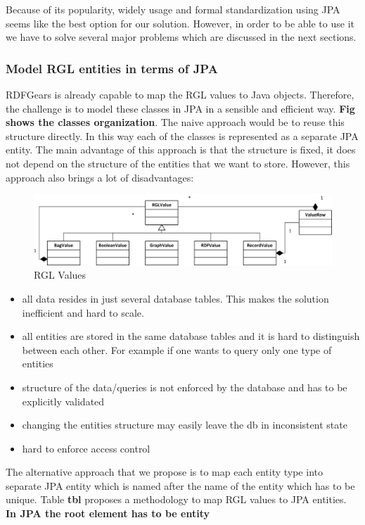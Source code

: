 \documentclass[a4paper, notitlepage]{article}
\begin{document}
Because of its popularity, widely usage and formal standardization using JPA seems like the best option for our solution. However, in order to be able to use it we have to solve several major problems which are discussed in the next sections.


\subsubsection{Model RGL entities in terms of JPA}
RDFGears is already capable to map the RGL values to Java objects. Therefore, the challenge is to model these classes in JPA in a sensible and efficient way. \textbf{Fig shows the classes organization}. The naive approach would be to reuse this structure directly. In this way each of the classes is represented as a separate JPA entity. The main advantage of this approach is that the structure is fixed, it does not depend on the structure of the entities that we want to store. However, this approach also brings a lot of disadvantages: 

\begin{figure}[h!]
  \centering
  	\includegraphics[scale=0.8]{diagrams/RGLValues.png}
  \caption{RGL Values }
  \label{fig_rglValues}
\end{figure}

\begin{itemize}
	\item all data resides in just several database tables. This makes the solution inefficient and hard to scale.
	\item all entities are stored in the same database tables and it is hard to distinguish between each other. For example if one wants to query only one type of entities
	\item structure of the data/queries is not enforced by the database and has to be explicitly validated
	\item changing the entities structure may easily leave the db in inconsistent state
	\item hard to enforce access control
\end{itemize}

The alternative approach that we propose is to map each entity type into separate JPA entity which is named after the name of the entity which has to be unique. Table \textbf{tbl} proposes a methodology to map RGL values to JPA entities. \textbf{In JPA the root element has to be entity}
\end{document}
